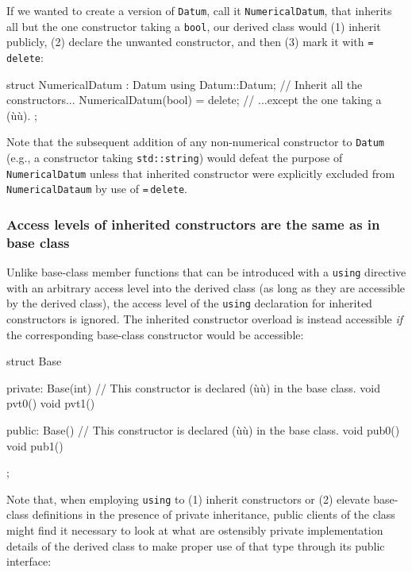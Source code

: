 \noindent If we wanted to create a version of \lstinline!Datum!, call it
\lstinline!NumericalDatum!, that inherits all but the one constructor
taking a \lstinline!bool!, our derived class would (1) inherit publicly,
(2) declare the unwanted constructor, and then (3) mark it with
\lstinline!=!\,\lstinline!delete!:

\begin{emcppslisting}[emcppsbatch=e12]
struct NumericalDatum : Datum
{
    using Datum::Datum;             // Inherit all the constructors...
    NumericalDatum(bool) = delete;  // ...except the one taking a (ù{}ù).
};
\end{emcppslisting}

\noindent Note that the subsequent addition of any non-numerical constructor to
\lstinline!Datum! (e.g., a constructor taking \lstinline!std::string!) would
defeat the purpose of \lstinline!NumericalDatum! unless that inherited constructor were explicitly excluded from \lstinline!NumericalDataum! by use of \lstinline!=!\,\lstinline!delete!.

\subsubsection[Access levels of inherited constructors are the same as in base class]{Access levels of inherited constructors are the same as in base class}\label{access-levels-of-inherited-constructors-are-same-as-in-base-class}

Unlike base-class member functions that can be introduced with a
\lstinline!using! directive with an arbitrary access level into the derived
class (as long as they are accessible by the derived class), the access
level of the \lstinline!using! declaration for inherited constructors is
ignored. The inherited constructor overload is instead
accessible \emph{if} the corresponding base-class constructor would be
accessible:

\begin{emcppslisting}[emcppsbatch=e13]
struct Base
{
private:
    Base(int) { }  // This constructor is declared (ù{}ù) in the base class.
    void pvt0() { }
    void pvt1() { }

public:
    Base() { }     // This constructor is declared (ù{}ù) in the base class.
    void pub0() { }
    void pub1() { }
};
\end{emcppslisting}

\noindent Note that, when employing \lstinline!using! to (1) inherit constructors or
(2) elevate base-class definitions in the presence of private
inheritance, public clients of the class might find it necessary
to look at what are ostensibly private implementation details of the
derived class to make proper use of that type through its
public interface:

